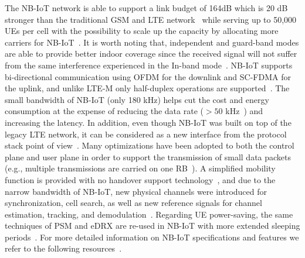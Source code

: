 \documentclass[]{IEEEtran}
\begin{document}
The NB-IoT network is able to support a link budget of 164dB which is 20 dB stronger than the traditional GSM and LTE network~\cite{hwang_survey_2019} while serving up to 50,000 UEs per cell with the possibility to scale up the capacity by allocating more carriers for NB-IoT~\cite{raza2017low}.
It is worth noting that, independent and guard-band modes are able to provide better indoor coverage since the received signal will not suffer from the same interference experienced in the In-band mode~\cite{poursafar2017long}.
NB-IoT supports bi-directional communication using OFDM for the downlink and SC-FDMA for the uplink, and unlike LTE-M only half-duplex operations are supported~\cite{ding_iot_2020}.
The small bandwidth of NB-IoT (only 180 kHz) helps cut the cost and energy consumption at the expense of reducing the data rate ($> 50$ kHz~\cite{rico2016overview}) and increasing the latency.
In addition, even though NB-IoT was built on top of the legacy LTE network, it can be considered as a new interface from the protocol stack point of view~\cite{mekki2019comparative}.
Many optimizations have been adopted to both the control plane and user plane in order to support the transmission of small data packets~\cite{sharma2019toward} (e.g., multiple transmissions are carried on one RB~\cite{accurso_exploring_2021}).
A simplified mobility function is provided with no handover support technology~\cite{foubert2020long}, and due to the narrow bandwidth of NB-IoT, new physical channels were introduced for synchronization, cell search, as well as new reference signals for channel estimation, tracking, and demodulation~\cite{rico2016overview}.
Regarding UE power-saving, the same techniques of PSM and eDRX are re-used in NB-IoT with more extended sleeping periods~\cite{vaezi_cellular_2022_2}.
For more detailed information on NB-IoT specifications and features we refer to the following resources~\cite{wang2017primer,chen2017narrow}. 
\end{document}
